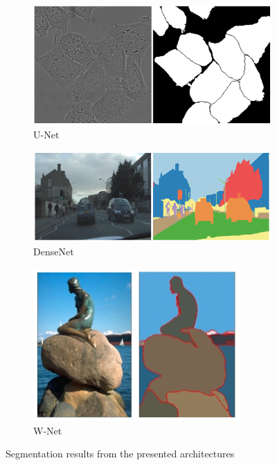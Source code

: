 \begin{figure}
    \newcommand{\SegmentationExampleImageWidth}{0.3\textwidth}
    \centering
    \hfill
    \begin{subfigure}{\SegmentationExampleImageWidth}
        \includegraphics[width=\textwidth]{images/segmentation_example_unet}
        \caption{U-Net~\cite{unet15}}
        \label{fig:exseg_unet}
    \end{subfigure}
    \hfill
    \begin{subfigure}{0.4\textwidth}
        \includegraphics[width=\textwidth]{images/segmentation_example_densenet}
        \caption{DenseNet~\cite{denseseg17}}
        \label{fig:exseg_densenet}
    \end{subfigure}
    \hfill
    \begin{subfigure}{0.21\textwidth}
        \includegraphics[width=\textwidth]{images/segmentation_example_wnet}
        \caption{W-Net~\cite{wnet17}}
        \label{fig:exseg_wnet}
    \end{subfigure}
    \hfill
    \caption{Segmentation results from the presented architectures}
    \label{fig:segmentation_examples}
\end{figure}

\newpage